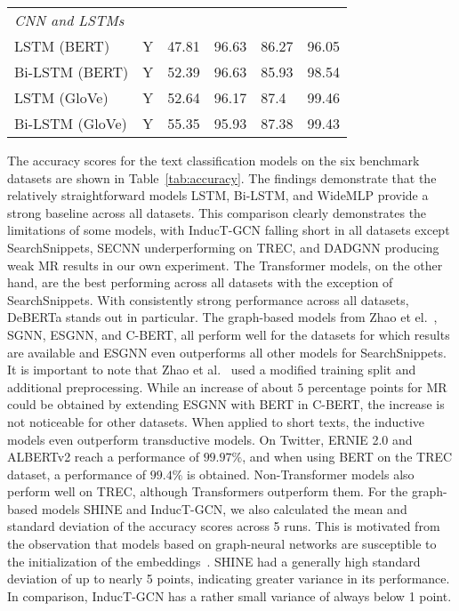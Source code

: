 \documentclass[runningheads]{llncs}
\begin{document}
\begin{table*}[!ht]
\begin{tabular}{lcllll}
        \midrule
        \textit{CNN and LSTMs} \\
        LSTM (BERT)               & Y                   & 47.81            & 96.63           & 86.27             & 96.05            \\
        Bi-LSTM (BERT)            & Y                   & 52.39            & 96.63           & 85.93             & 98.54            \\
        LSTM (GloVe)              & Y                   & 52.64            & 96.17           & 87.4              & 99.46            \\
        Bi-LSTM (GloVe)           & Y                   & 55.35            & 95.93           & 87.38             & 99.43            \\
        \bottomrule
    \end{tabular}
\end{table*}

The accuracy scores for the text classification models on the six benchmark datasets are shown in Table~\ref{tab:accuracy}. The findings demonstrate that the relatively straightforward models LSTM, Bi-LSTM, and WideMLP provide a strong baseline across all datasets. 
This comparison clearly demonstrates the limitations of some models, with InducT-GCN falling short in all datasets except SearchSnippets, SECNN underperforming on TREC, and DADGNN producing weak MR results in our own experiment. 
The Transformer models, on the other hand, are the best performing across all datasets with the exception of SearchSnippets. With consistently strong performance across all datasets, DeBERTa stands out in particular.
The graph-based models from Zhao et el.~\cite{zhao2021sequential}, SGNN, ESGNN, and C-BERT, all perform well for the datasets for which results are available and ESGNN even outperforms all other models for SearchSnippets. 
It is important to note that Zhao et al.~\cite{zhao2021sequential} used a modified training split and additional preprocessing. 
While an increase of about $5$ percentage points for MR could be obtained by extending ESGNN with BERT in C-BERT, the increase is not noticeable for other datasets.
When applied to short texts, the inductive models even outperform transductive models. 
On Twitter, ERNIE 2.0 and ALBERTv2 reach a performance of $99.97\%$, and when using BERT on the TREC dataset, a performance of $99.4\%$ is obtained.
Non-Transformer models also perform well on TREC, although Transformers outperform them. 
For the graph-based models SHINE and InducT-GCN, we also calculated the mean and standard deviation of the accuracy scores across 5 runs. 
This is motivated from the observation that models based on graph-neural networks are susceptible to the initialization of the embeddings~\cite{pitfallsShchur2018}.
SHINE had a generally high standard deviation of up to nearly 5 points, indicating greater variance in its performance.
In comparison, InducT-GCN has a rather small variance of always below 1 point. 
\end{document}
